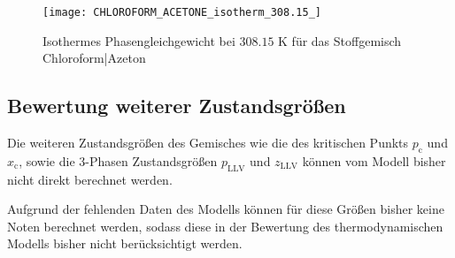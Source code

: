 \documentclass[../thesis.tex]{subfiles}
\begin{document}
\begin{figure}[hbt]
	\centering
	\texttt{[image: CHLOROFORM\_ACETONE\_isotherm\_308.15\_]}
	\caption{Isothermes Phasengleichgewicht bei $ 308$.$15$ K für das Stoffgemisch Chloroform|Azeton}
	\label{fig: druckminimumazeotrop}
\end{figure}

\subsection{Bewertung weiterer Zustandsgrößen}

Die weiteren Zustandsgrößen des Gemisches wie die des kritischen Punkts $ p_{\mathrm{c}}$ und $ x_{\mathrm{c}}$, sowie die 3-Phasen Zustandsgrößen $p_{\mathrm{LLV}}$ und $z_{\mathrm{LLV}}$ können vom Modell bisher nicht direkt berechnet werden.

Aufgrund der fehlenden Daten des Modells können für diese Größen bisher keine Noten berechnet werden, sodass diese in der Bewertung des thermodynamischen Modells bisher nicht berücksichtigt werden.
\end{document}
